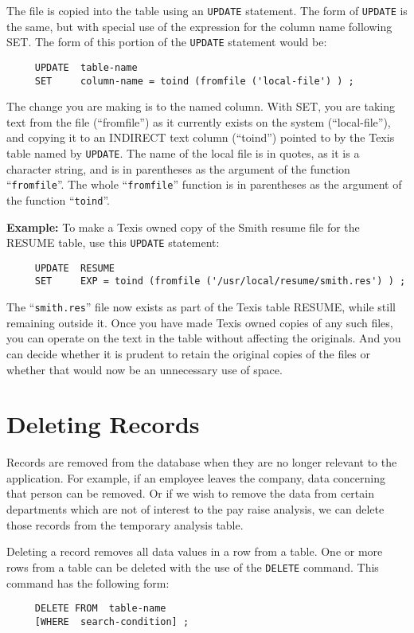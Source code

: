 The file is copied into the table using an \verb`UPDATE` statement.  The form
of \verb`UPDATE` is the same, but with special use of the expression for the
column name following SET.  The form of this portion of the \verb`UPDATE`
statement would be:

\begin{verbatim}
     UPDATE  table-name
     SET     column-name = toind (fromfile ('local-file') ) ;
\end{verbatim}

The change you are making is to the named column.  With SET, you are
taking text from the file (``fromfile'') as it currently exists on the
system (``local-file''), and copying it to an INDIRECT text column
(``toind'') pointed to by the Texis table named by \verb`UPDATE`.  The name
of the local file is in quotes, as it is a character string, and is in
parentheses as the argument of the function ``\verb`fromfile`''.  The
whole ``\verb`fromfile`'' function is in parentheses as the argument
of the function ``\verb`toind`''.

{\bf Example:}
To make a Texis owned copy of the Smith resume file for the RESUME
table, use this \verb`UPDATE` statement:

\begin{verbatim}
     UPDATE  RESUME
     SET     EXP = toind (fromfile ('/usr/local/resume/smith.res') ) ;
\end{verbatim}

The ``\verb`smith.res`'' file now exists as part of the Texis table
RESUME, while still remaining outside it.  Once you have made Texis owned
copies of any such files, you can operate on the text in the table without
affecting the originals.  And you can decide whether it is prudent to
retain the original copies of the files or whether that would now be an
unnecessary use of space.

\section{Deleting Records}

Records are removed from the database when they are no longer relevant
to the application.  For example, if an employee leaves the company,
data concerning that person can be removed.  Or if we wish to remove
the data from certain departments which are not of interest to the pay
raise analysis, we can delete those records from the temporary
analysis table.

Deleting a record removes all data values in a row from a table.  One
or more rows from a table can be deleted with the use of the \verb`DELETE`
command.  This command has the following form:
\begin{verbatim}
     DELETE FROM  table-name
     [WHERE  search-condition] ;
\end{verbatim}

